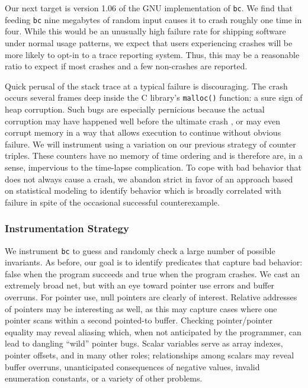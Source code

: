 Our next target is version 1.06 of the GNU implementation of
\texttt{bc}.  We find that feeding \texttt{bc} nine megabytes of
random input causes it to crash roughly one time in four.  While this
would be an unusually high failure rate for shipping software under
normal usage patterns, we expect that users experiencing crashes will
be more likely to opt-in to a trace reporting system.  Thus, this may
be a reasonable ratio to expect if most crashes and a few non-crashes
are reported.
  
Quick perusal of the stack trace at a typical failure is discouraging.
The crash occurs several frames deep inside the C library's
\texttt{malloc()} function: a sure sign of heap corruption.  Such bugs
are especially pernicious because the actual corruption may have
happened well before the ultimate crash \cite{Eisenstadt1993b}, or may
even corrupt memory in a way that allows execution to continue without
obvious failure.  We will instrument using a variation on our previous
strategy of counter triples.  These counters have no memory of time
ordering and is therefore are, in a sense, impervious to the
time-lapse complication.  To cope with bad behavior that does not
always cause a crash, we abandon strict  in favor of an approach based on
statistical modeling to identify behavior which is broadly correlated
with failure in spite of the occasional successful counterexample.

\subsubsection{Instrumentation Strategy}

We instrument \texttt{bc} to guess and randomly check a large number
of possible invariants.  As before, our goal is to identify predicates
that capture bad behavior: false when the program succeeds and true
when the program crashes.  We cast an extremely broad net, but with an
eye toward pointer use errors and buffer overruns.  For pointer use,
null pointers are clearly of interest.  Relative addresses of pointers
may be interesting as well, as this may capture cases where one
pointer scans within a second pointed-to buffer.  Checking
pointer/pointer equality may reveal aliasing which, when not
anticipated by the programmer, can lead to dangling ``wild'' pointer
bugs.  Scalar variables serve as array indexes, pointer offsets, and
in many other roles; relationships among scalars may reveal buffer
overruns, unanticipated consequences of negative values, invalid
enumeration constants, or a variety of other problems.

